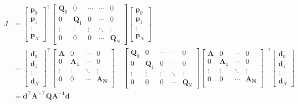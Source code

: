 \documentclass[times,authoryear]{elsarticle}
\begin{document}
\begin{equation}
	\begin{align}
		J 
		&= 
		\begin{bmatrix}\boldsymbol p_0\\\boldsymbol p_1\\\vdots\\\boldsymbol p_ N\end{bmatrix}^\top
		\begin{bmatrix}\boldsymbol Q_0&0&\cdots&\cdots&0\\0&\boldsymbol Q_1&0&\cdots&0\\\vdots&\vdots&\vdots&\ddots&\vdots\\0&0&0&\cdots&\boldsymbol Q_\mathrm N\end{bmatrix}
		\begin{bmatrix}\boldsymbol p_0\\\boldsymbol p_1\\\vdots\\\boldsymbol p_ N\end{bmatrix}
		\\
		&= 
		\begin{bmatrix}
		\boldsymbol{d}_{0} \\
		\boldsymbol{d}_{1} \\
		\vdots  \\
		\boldsymbol{d}_{N} 
		\end{bmatrix}^{\top}
		\begin{bmatrix}
		\boldsymbol{A} & 0 &\cdots &0 \\
		0 & \boldsymbol{A_{1}}  &\cdots &0 \\ 
		\vdots &\vdots &\ddots &\vdots    \\
		0 & 0 &\cdots  &\boldsymbol{A_{N}} \\
		\end{bmatrix}^{-\top}
		\begin{bmatrix}\boldsymbol Q_0&0&\cdots&\cdots&0\\0&\boldsymbol Q_1&0&\cdots&0\\\vdots&\vdots&\vdots&\ddots&\vdots\\0&0&0&\cdots&\boldsymbol Q_\mathrm N\end{bmatrix}
		\begin{bmatrix}
		\boldsymbol{A} & 0 &\cdots &0 \\
		0 & \boldsymbol{A_{1}}  &\cdots &0 \\ 
		\vdots &\vdots &\ddots &\vdots    \\
		0 & 0 &\cdots  &\boldsymbol{A_{N}} \\
		\end{bmatrix} ^{-1}
		\begin{bmatrix}
		\boldsymbol{d}_{0} \\
		\boldsymbol{d}_{1} \\
		\vdots  \\
		\boldsymbol{d}_{N} 
		\end{bmatrix}
		\\
		&= 
		\boldsymbol{d}^{\top} \boldsymbol{A}^{-\top}\boldsymbol{Q}\boldsymbol{A^{-1}}\boldsymbol{d}
	\end{align}
\end{equation}
\end{document}
